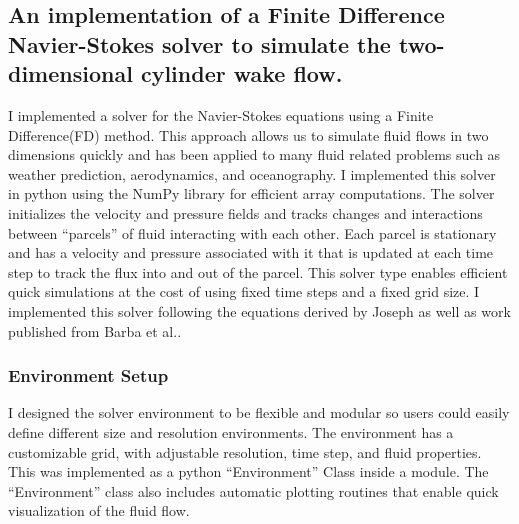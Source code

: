 

\subsection{An implementation of a Finite Difference Navier-Stokes solver to simulate the two-dimensional cylinder wake flow.}
I implemented a solver for the Navier-Stokes equations using a Finite Difference(FD) method.
This approach allows us to simulate fluid flows in two dimensions quickly and has been applied to many fluid related problems such as weather prediction, aerodynamics, and oceanography.
I implemented this solver in python using the NumPy library for efficient array computations.
The solver initializes the velocity and pressure fields and tracks changes and interactions between ``parcels'' of fluid interacting with each other.
Each parcel is stationary and has a velocity and pressure associated with it that is updated at each time step to track the flux into and out of the parcel.
This solver type enables efficient quick simulations at the cost of using fixed time steps and a fixed grid size.
I implemented this solver following the equations derived by Joseph as well as work published from Barba et al.\cite{barba2018cfd}.


\subsubsection{Environment Setup}
I designed the solver environment to be flexible and modular so users could easily define different size and resolution environments.
The environment has a customizable grid, with adjustable resolution, time step, and fluid properties.
This was implemented as a python ``Environment'' Class inside a module.
The ``Environment'' class also includes automatic plotting routines that enable quick visualization of the fluid flow.

